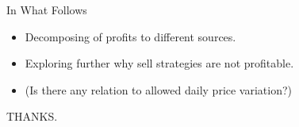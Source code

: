 \documentclass{beamer}
\begin{document}
\begin{frame}{In What Follows}
    \begin{itemize}
        \item Decomposing of profits to different sources.
        \item Exploring further why sell strategies are not profitable.
        \item (Is there any relation to allowed daily price variation?)
    \end{itemize}
\end{frame}

\begin{frame}
    \begin{center}
        \huge
        THANKS.
    \end{center}
\end{frame}



\end{document}
